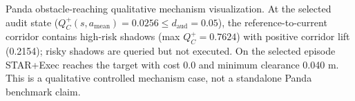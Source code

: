 Panda obstacle-reaching qualitative mechanism visualization. At the selected audit state ($Q_C^+(s,a_\mathrm{mean})=0.0256 \le d_\mathrm{aud}=0.05$), the reference-to-current corridor contains high-risk shadows (max $Q_C^+=0.7624$) with positive corridor lift (0.2154); risky shadows are queried but not executed. On the selected episode STAR+Exec reaches the target with cost 0.0 and minimum clearance 0.040 m. This is a qualitative controlled mechanism case, not a standalone Panda benchmark claim.
